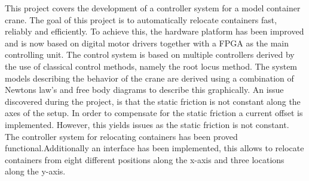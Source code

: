 This project covers the development of a controller system for a model container crane. The goal of this project is to automatically relocate containers fast, reliably and efficiently. To achieve this, the hardware platform has been improved and is now based on digital motor drivers together with a FPGA as the main controlling unit. The control system is based on multiple controllers derived by the use of classical control methods, namely the root locus method. The system models describing the behavior of the crane are derived using a combination of Newtons law's and free body diagrams to describe this graphically. An issue discovered during the project, is that the static friction is not constant along the axes of the setup. In order to compensate for the static friction a current offset is implemented. However, this yields issues as the static friction is not constant. The controller system for relocating containers has been proved functional.Additionally an interface has been implemented, this allows to relocate containers from eight different positions along the x-axis and three locations along the y-axis.          